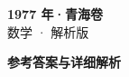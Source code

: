 \documentclass[zihao=-4, a4paper]{ctexart}
\begin{document}
\begin{center}
  {\Large\bfseries 1977 年·青海卷}\\[4pt]
  {\large 数学 · 解析版}
\end{center}
\medskip
{}

\clearpage
{}
\begin{center}{\Large\bfseries 参考答案与详细解析}\end{center}
\medskip

\end{document}

